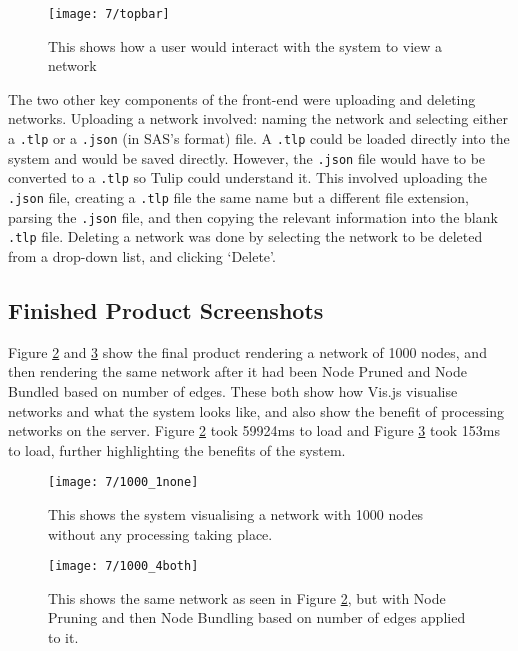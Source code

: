 \documentclass[../dissertation.tex]{subfiles}
\begin{document}
\begin{figure}[H]
    \centering
    \texttt{[image: 7/topbar]}
    \caption{This shows how a user would interact with the system to view a network}
    \label{fig:topbar}
\end{figure}

The two other key components of the front-end were uploading and deleting networks. Uploading a network involved: naming the network and selecting either a \texttt{.tlp} or a \texttt{.json} (in SAS's format) file. A \texttt{.tlp} could be loaded directly into the system and would be saved directly. However, the \texttt{.json} file would have to be converted to a \texttt{.tlp} so Tulip could understand it. This involved uploading the \texttt{.json} file, creating a \texttt{.tlp} file the same name but a different file extension, parsing the \texttt{.json} file, and then copying the relevant information into the blank \texttt{.tlp} file. Deleting a network was done by selecting the network to be deleted from a drop-down list, and clicking `Delete'.

\subsection{Finished Product Screenshots}

Figure \ref{fig:1000-none} and \ref{fig:1000-both} show the final product rendering a network of 1000 nodes, and then rendering the same network after it had been Node Pruned and Node Bundled based on number of edges. These both show how Vis.js visualise networks and what the system looks like, and also show the benefit of processing networks on the server. Figure \ref{fig:1000-none} took 59924ms to load and Figure \ref{fig:1000-both} took 153ms to load, further highlighting the benefits of the system.

\begin{figure}[H]
    \centering
    \texttt{[image: 7/1000\_1none]}
    \caption{This shows the system visualising a network with 1000 nodes without any processing taking place.}
    \label{fig:1000-none}
\end{figure}

\begin{figure}[H]
    \centering
    \texttt{[image: 7/1000\_4both]}
    \caption{This shows the same network as seen in Figure \ref{fig:1000-none}, but with Node Pruning and then Node Bundling based on number of edges applied to it.}
    \label{fig:1000-both}
\end{figure}
\end{document}
